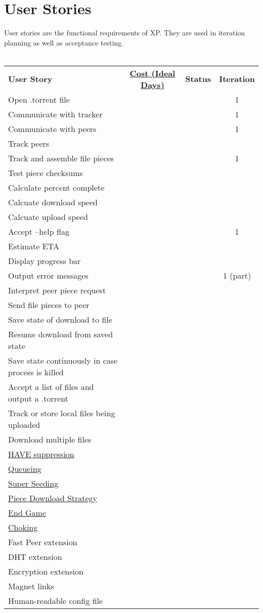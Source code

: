 \documentclass[letter]{scrartcl}
\begin{document}
\section{User Stories}
User stories are the functional requirements of XP. They are used in iteration planning as well as acceptance testing.
\\\\
\begin{tabularx}{\textwidth}{X c c c}
\textbf{User Story} & \href{http://c2.com/cgi/wiki?IdealProgrammingTime}{\textbf{Cost (Ideal Days)}}
& \textbf{Status} & \textbf{Iteration} \\
Open .torrent file & & & 1 \\
Communicate with tracker & & & 1 \\
Communicate with peers & & & 1 \\
Track peers \\
Track and assemble file pieces & & & 1 \\
Test piece checksums \\
Calculate percent complete \\
Calcuate download speed \\
Calcuate upload speed \\
Accept --help flag & & & 1 \\
Estimate ETA \\
Display progress bar \\
Output error messages & & & 1 (part) \\
Interpret peer piece request \\
Send file pieces to peer \\
Save state of download to file \\
Resume download from saved state \\
Save state continuously in case process is killed \\
Accept a list of files and output a .torrent \\
Track or store local files being uploaded \\
Download multiple files \\
\href{https://wiki.theory.org/BitTorrentSpecification\#have:_.3Clen.3D0005.3E.3Cid.3D4.3E.3Cpiece_index.3E}{HAVE suppression} \\
\href{https://wiki.theory.org/BitTorrentSpecification\#Queuing}{Queueing} \\
\href{https://wiki.theory.org/BitTorrentSpecification\#Super_Seeding}{Super Seeding} \\
\href{https://wiki.theory.org/BitTorrentSpecification\#Piece_downloading_strategy}{Piece Download Strategy} \\
\href{https://wiki.theory.org/BitTorrentSpecification\#End_Game}{End Game} \\
\href{https://wiki.theory.org/BitTorrentSpecification\#Choking_and_Optimistic_Unchoking}{Choking} \\
Fast Peer extension \\
DHT extension \\
Encryption extension \\
Magnet links \\
Human-readable config file
\end{tabularx}
\end{document}
